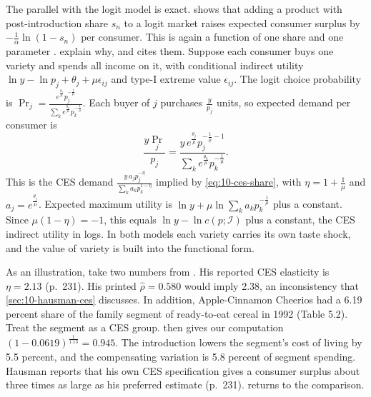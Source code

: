 \begin{remark}\label{rem:10-ces-logit}
The parallel with the logit model is exact.  shows that adding a product with
post-introduction share $s_n$ to a logit market raises expected consumer surplus by
$-\frac{1}{\alpha}\ln(1 - s_n)$ per consumer. This is again a function of one share and one parameter
\citep{SmallRosen1981,McFadden1981}. \citet{AndersonDePalmaThisse1992} explain why, and
\citet[n.~29]{Hausman1997} cites them. Suppose each consumer buys one variety and spends all income on it,
with conditional indirect utility $\ln y - \ln p_j + \theta_j + \mu\epsilon_{ij}$ and type-I extreme value
$\epsilon_{ij}$. The logit choice probability is
$\Pr_j = \frac{e^{\frac{\theta_j}{\mu}}p_j^{-\frac{1}{\mu}}}{\sum_ke^{\frac{\theta_k}{\mu}}p_k^{-\frac{1}{\mu}}}$.
Each buyer of $j$ purchases $\frac{y}{p_j}$ units, so expected demand per consumer is
\begin{equation*}
  \frac{y\Pr_j}{p_j} = \frac{y\,e^{\frac{\theta_j}{\mu}}p_j^{-\frac{1}{\mu}-1}}{\sum_ke^{\frac{\theta_k}{\mu}}p_k^{-\frac{1}{\mu}}} .
\end{equation*}
This is the CES demand $\frac{y\,a_jp_j^{-\eta}}{\sum_ka_kp_k^{1-\eta}}$ implied by \eqref{eq:10-ces-share}, with
$\eta = 1 + \frac{1}{\mu}$ and $a_j = e^{\frac{\theta_j}{\mu}}$. Expected maximum utility is
$\ln y + \mu\ln\sum_ka_kp_k^{-\frac{1}{\mu}}$ plus a constant. Since $\mu(1-\eta) = -1$, this equals
$\ln y - \ln c(p;\mathcal{I})$ plus a constant, the CES indirect utility in logs. In both models each variety
carries its own taste shock, and the value of variety is built into the functional form.
\end{remark}

As an illustration, take two numbers from \citet{Hausman1997}. His reported CES elasticity is $\eta = 2.13$
(p.~231). His printed $\hat\rho = 0.580$ would imply 2.38, an inconsistency that \cref{sec:10-hausman-ces}
discusses. In addition, Apple-Cinnamon Cheerios had a 6.19 percent share of the family segment of ready-to-eat cereal in 1992
(Table 5.2). Treat the segment as a CES group.  then gives our computation
$(1 - 0.0619)^{\frac{1}{1.13}} = 0.945$.
The introduction lowers the segment's cost of living by 5.5 percent, and the compensating variation is 5.8
percent of segment spending. Hausman reports that his own CES specification gives a consumer surplus about
three times as large as his preferred estimate (p.~231).  returns to the comparison.

